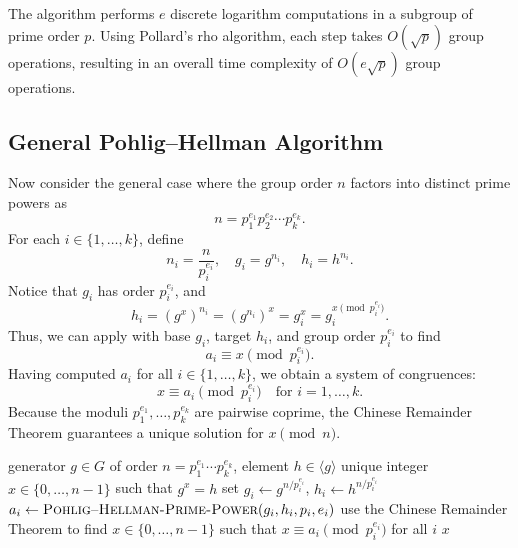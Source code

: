 \begin{remark}
    The algorithm performs \(e\) discrete logarithm computations in a subgroup of prime order \(p\).
    Using Pollard's rho algorithm, each step takes \(O(\sqrt{p})\) group operations, resulting in an overall time complexity of \(O(e \sqrt{p})\) group operations.
\end{remark}

\subsection*{General Pohlig--Hellman Algorithm}

Now consider the general case where the group order \(n\) factors into distinct prime powers as
\[
    n = p_1^{e_1} p_2^{e_2} \cdots p_k^{e_k}.
\]
For each \(i \in \{1, \dots, k\}\), define
\[
    n_i = \frac{n}{p_i^{e_i}}, \quad g_i = g^{n_i}, \quad h_i = h^{n_i}.
\]
Notice that \(g_i\) has order \(p_i^{e_i}\), and
\[
    h_i = (g^x)^{n_i} = (g^{n_i})^x = g_i^x = g_i^{x \pmod{p_i^{e_i}}}.
\]
Thus, we can apply  with base \(g_i\), target \(h_i\), and group order \(p_i^{e_i}\) to find
\[
    a_i \equiv x \pmod{p_i^{e_i}}.
\]
Having computed \(a_i\) for all \(i \in \{1, \dots, k\}\), we obtain a system of congruences:
\[
    x \equiv a_i \pmod{p_i^{e_i}} \quad \text{for } i = 1, \dots, k.
\]
Because the moduli \(p_1^{e_1}, \dots, p_k^{e_k}\) are pairwise coprime, the Chinese Remainder Theorem guarantees a unique solution for \(x \pmod{n}\).

\begin{algorithm}[H]
    \caption{General Pohlig--Hellman Algorithm}\label{alg:pohlig-hellman-general}
    \begin{algorithmic}[1]
        \Input generator \(g \in G\) of order \(n = p_1^{e_1} \cdots p_k^{e_k}\), element \(h \in \langle g \rangle\)
        \Output unique integer \(x \in \{0, \dots, n - 1\}\) such that \(g^x = h\)
            \State set \(g_i \gets g^{n / p_i^{e_i}}\), \(h_i \gets h^{n / p_i^{e_i}}\)
            \State \(a_i \gets \textsc{Pohlig--Hellman-Prime-Power}(g_i, h_i, p_i, e_i)\)
        \EndFor
        \State use the Chinese Remainder Theorem to find \(x \in \{0, \dots, n-1\}\) such that \(x \equiv a_i \pmod{p_i^{e_i}}\) for all \(i\)
        \State \Return \(x\)
    \end{algorithmic}
\end{algorithm}


